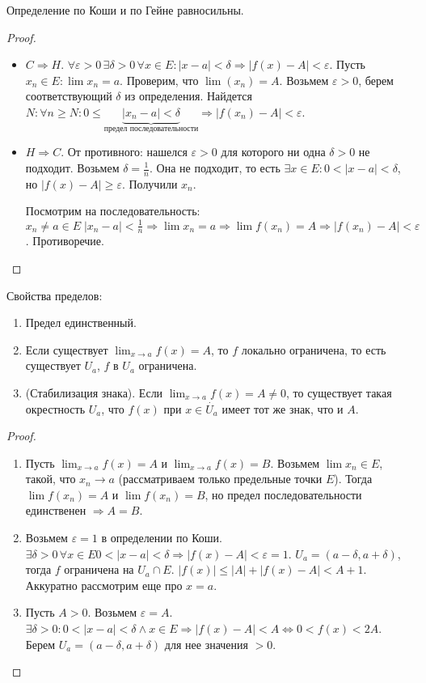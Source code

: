 \begin{theorem}
    Определение по Коши и по Гейне равносильны.
\end{theorem}
\begin{proof}
    \slashn
    \begin{itemize}
        \item $C \Rightarrow H$. $\forall \varepsilon > 0\, \exists \delta >0 \, \forall x \in E: |x-a| < \delta \Rightarrow |f(x) - A| < \varepsilon$. Пусть  $x_n \in E: \lim x_n = a$. Проверим, что  $\lim(x_n) = A$. Возьмем $\varepsilon > 0$, берем соответствующий  $\delta$ из определения. Найдется $N: \forall n \ge N: 0 \le \underbrace{|x_n-a|<\delta}_{\text{предел последовательности}} \Rightarrow |f(x_n) - A| < \varepsilon$. 
        \item $H \Rightarrow C$. От противного: нашелся  $\varepsilon > 0$ для которого ни одна  $\delta > 0$ не подходит. Возьмем  $\delta =\frac{1}{n}$. Она не подходит, то есть $\exists x \in E: 0 < |x-a| < \delta$, но  $|f(x) - A| \ge \varepsilon$. Получили $x_n$. 

            Посмотрим на последовательность:  $x_n \neq a \in E\; |x_n-a| < \frac{1}{n} \Rightarrow \lim x_n = a \Rightarrow \lim f(x_n) = A \Rightarrow |f(x_n) - A| < \varepsilon$. Противоречие. 
    \end{itemize}
\end{proof}
\slashn
Свойства пределов:
\begin{enumerate}
    \item Предел единственный.
    \item Если существует $\lim_{x\to a} f(x) = A$, то  $f$ локально ограничена, то есть существует  $U_a$,  $f$ в  $U_a$ ограничена.
    \item (Стабилизация знака). Если  $\lim_{x\to a} f(x) = A \neq 0$, то существует такая окрестность  $U_a$, что  $f(x)$ при  $x \in \dot{U_a}$ имеет тот же знак, что и  $A$.
\end{enumerate}
\begin{proof}
    \slashn
    \begin{enumerate}
        \item Пусть  $\lim_{x\to a} f(x) = A$ и  $\lim_{x\to a} f(x) = B$. Возьмем  $\lim x_n \in E$, такой, что  $x_n \to a$ (рассматриваем только предельные точки $E$). Тогда $\lim f(x_n) = A$ и  $\lim f(x_n) = B$, но предел последовательности единственен $\Rightarrow A=B$.  
        \item Возьмем $\varepsilon = 1$ в определении по Коши.  $\exists \delta > 0\, \forall x \in E 0 < |x-a| < \delta \Rightarrow |f(x) - A| < \varepsilon = 1$. $U_a = (a - \delta, a + \delta)$, тогда  $f$ ограничена на  $U_a \cap E$.  $|f(x)| \le |A| + |f(x) - A| < A + 1$. Аккуратно рассмотрим еще про $x = a$.
        \item Пусть $A > 0$. Возьмем  $\varepsilon = A$.  $\exists \delta > 0: 0 < |x-a| < \delta \land x \in E \Rightarrow |f(x) - A| < A \iff 0 < f(x) < 2A$. Берем  $U_a = (a-\delta, a+\delta)$ для нее значения  $>0$.
    \end{enumerate}
\end{proof}
